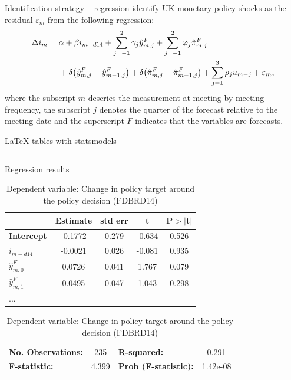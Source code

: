 \documentclass[aspectratio=169]{beamer}          %
\begin{document}
\begin{frame}{Identification strategy – regression}
\textcite{cloyneMacroeconomicEffectsMonetary2016} identify UK monetary-policy shocks as the residual $\varepsilon_m$ from the following regression:
\begin{align}
  \Delta i_m ={}& \alpha  
  + \beta i_{m-d14}
  + \sum_{j=-1}^{2} \gamma_j \hat{y}_{m,j}^{F}
  + \sum_{j=-1}^{2} \varphi_j \hat{\pi}_{m,j}^{F} \notag\\
  &+ \delta \bigl(\hat{y}_{m,j}^{F}-\hat{y}_{m-1,j}^{F}\bigr)
  + \delta \bigl(\hat{\pi}_{m,j}^{F}-\hat{\pi}_{m-1,j}^{F}\bigr)
  + \sum_{j=1}^{3} \rho_j u_{m-j} + \varepsilon_m,  \label{eq:identification}
\end{align}
where the subscript $m$ descries the measurement at meeting-by-meeting frequency, the subscript $j$ denotes the quarter of the forecast relative to the meeting date and the superscript $F$ indicates that the variables are forecasts.
\end{frame}

\begin{frame}{LaTeX tables with statsmodels}
    \inputminted{python}{latex_table.py}
\end{frame}

\begin{frame}{Regression results}

        \begin{table}[]
            \begin{center}
            \caption{Dependent variable: Change in policy target around the policy decision (FDBRD14)}
            \begin{tabular}{lcccc}
        \toprule \hline
        & \textbf{Estimate} & \textbf{std err} & \textbf{t} & \textbf{P$> |$t$|$}  \\
        \midrule
        \textbf{Intercept}  &      -0.1772  &        0.279     &    -0.634  &         0.526         \\
        $i_{m-d14}$    &      -0.0021  &        0.026     &    -0.081  &         0.935        \\
        $\hat{y}_{m,0}^F$    &       0.0726  &        0.041     &     1.767  &         0.079        \\
        $\hat{y}_{m,1}^F$    &       0.0495  &        0.047     &     1.043  &         0.298      \\
        ... & & & &  \\
        \end{tabular}
            \begin{tabular}{lclc}
            \toprule
            \textbf{No. Observations:} & 235 & \textbf{  R-squared:         } & 0.291 \\
            \textbf{  F-statistic:       } & 4.399 & \textbf{  Prob (F-statistic):} &  1.42e-08  \\
            \bottomrule
            \end{tabular}
            \end{center}

        \end{table}    
\end{frame}
\end{document}
